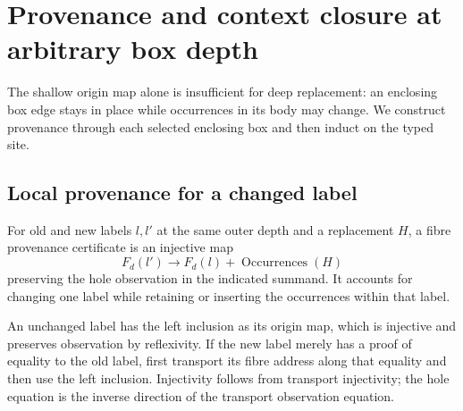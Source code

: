 \section{Provenance and context closure at arbitrary box depth}
The shallow origin map alone is insufficient for deep replacement: an enclosing
box edge stays in place while occurrences in its body may change. We construct
provenance through each selected enclosing box and then induct on the typed site.

\subsection{Local provenance for a changed label}
\begin{definition}\label{term:fibre-provenance}
For old and new labels $l,l'$ at the same outer depth and a replacement $H$, a
fibre provenance certificate is an injective map
\[
 F_d(l')\longrightarrow F_d(l)+\operatorname{Occurrences}(H)
\]
preserving the hole observation in the indicated summand. It accounts for
changing one label while retaining or inserting the occurrences within that label.
\end{definition}
An unchanged label has the left inclusion as its origin map, which is injective
and preserves observation by reflexivity. If the new label merely has a proof
of equality to the old label, first transport its fibre address along that
equality and then use the left inclusion. Injectivity follows from transport
injectivity; the hole equation is the inverse direction of the transport
observation equation.

